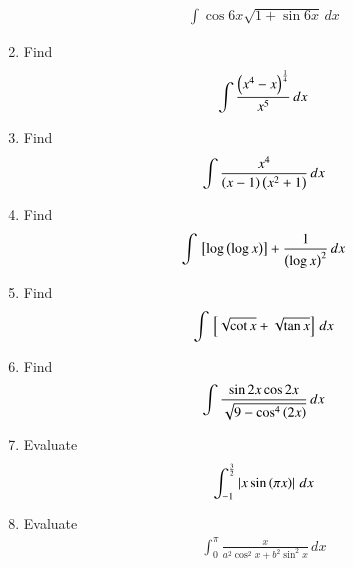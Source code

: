 \begin{enumerate}[label=\arabic*.,ref=\thesubsection.\theenumi]
\begin{align}
\int\cos  6x\sqrt{1+\sin6x} \,dx
\end{align}
%
\item Find
\begin{align}
\int \frac{\left(x^4-x\right)^{\frac{1}{4}}}{x^5} \,dx
\end{align}
%
\item Find
\begin{align}
\int \frac{x^4}{\left(x-1\right)\left(x^2+1\right)} \,dx
\end{align}
%
\item Find
\begin{align}
\int {}\left[\log \left(\log x\right)\right]+\frac{1}{\left(\log x\right)^2} \,dx
\end{align}
%
\item Find
\begin{align}
\int {}\left[\sqrt{\cot x} + \sqrt{\tan x} \right]\,dx
\end{align}
%
\item Find
\begin{align}
\int \frac{\sin 2x \cos 2x }{\sqrt{9-\cos^4\left(2x\right)}}\,dx
\end{align}
%
\item Evaluate
\begin{align}
\int_{-1}^{\frac{3}{2}}\left\vert x\sin \left(\pi x\right)\right\vert \,dx
\end{align}
%
\item Evaluate
\begin{align}
\int_{0}^{\pi}\frac{x}{a^2\cos^2x + b^2\sin^2x} \,dx
\end{align}

\end{enumerate}
